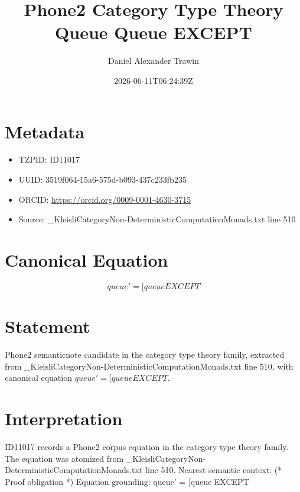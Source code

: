 \documentclass[11pt]{article}
\title{Phone2 Category Type Theory Queue Queue EXCEPT}
\author{Daniel Alexander Trawin}
\date{2026-06-11T06:24:39Z}
\begin{document}
\maketitle
\section*{Metadata}
\begin{itemize}
\item TZPID: ID11017
\item UUID: 3519f064-15a6-575d-b093-437c233fb235
\item ORCID: \url{https://orcid.org/0009-0001-4630-3715}
\item Source: _KleisliCategoryNon-DeterministicComputationMonads.txt line 510
\end{itemize}
\section*{Canonical Equation}
\[
queue' = [queue EXCEPT
\]
\section*{Statement}
Phone2 semanticnote candidate in the category type theory family, extracted from _KleisliCategoryNon-DeterministicComputationMonads.txt line 510, with canonical equation $queue' = [queue EXCEPT$.
\section*{Interpretation}
ID11017 records a Phone2 corpus equation in the category type theory family. The equation was atomized from _KleisliCategoryNon-DeterministicComputationMonads.txt line 510. Nearest semantic context: (* Proof obligation *) Equation grounding: queue' = [queue EXCEPT
\end{document}
